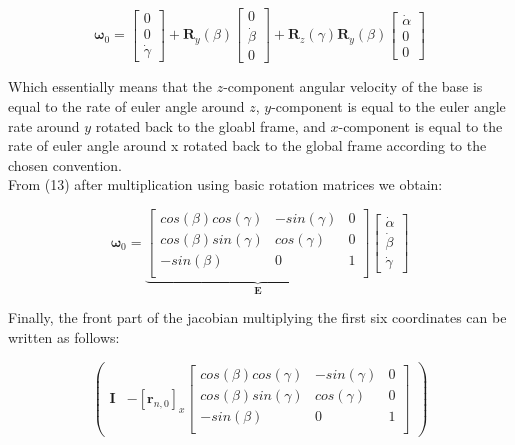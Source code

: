 \documentclass[a4paper]{article}
\begin{document}
\begin{equation}
\boldsymbol{\omega}_{0} = \begin{bmatrix} 0 \\ 0 \\ \dot{\gamma} \end{bmatrix} + \boldsymbol{R}_{y}(\beta)\begin{bmatrix} 0 \\ \dot{\beta} \\ 0 \end{bmatrix} +
                         \boldsymbol{R}_{z}(\gamma)\boldsymbol{R}_{y}(\beta)\begin{bmatrix} \dot{\alpha} \\ 0 \\ 0 \end{bmatrix}
\end{equation}

\noindent Which essentially means that the $z$-component angular velocity of the base is equal to the rate of euler angle around $z$, $y$-component is equal to the euler angle rate around $y$ rotated back to the gloabl frame, 
and $x$-component is equal to the rate of euler angle around x rotated back to the global frame according to the chosen convention. \\

\noindent From (13) after multiplication using basic rotation matrices we obtain:

\begin{equation}          
\boldsymbol{\omega}_{0} = \underbrace{\begin{bmatrix} cos(\beta)cos(\gamma) & -sin(\gamma) & 0 \\ 
                        cos(\beta)sin(\gamma) & cos(\gamma) & 0 \\
                        -sin(\beta) & 0 & 1 \\  \end{bmatrix}}_{\boldsymbol{E}} \begin{bmatrix} \dot{\alpha} \\ \dot{\beta} \\ \dot{\gamma} \end{bmatrix}
\end{equation}

\noindent Finally, the front part of the jacobian multiplying the first six coordinates can be written as follows:

\begin{equation}
\begin{pmatrix} \boldsymbol{I} & - [\boldsymbol{r}_{n, 0}]_{x}\begin{bmatrix} cos(\beta)cos(\gamma) & -sin(\gamma) & 0 \\ 
                        cos(\beta)sin(\gamma) & cos(\gamma) & 0 \\
                        -sin(\beta) & 0 & 1 \\  \end{bmatrix}    \end{pmatrix} 
\end{equation}
          
\end{document}
